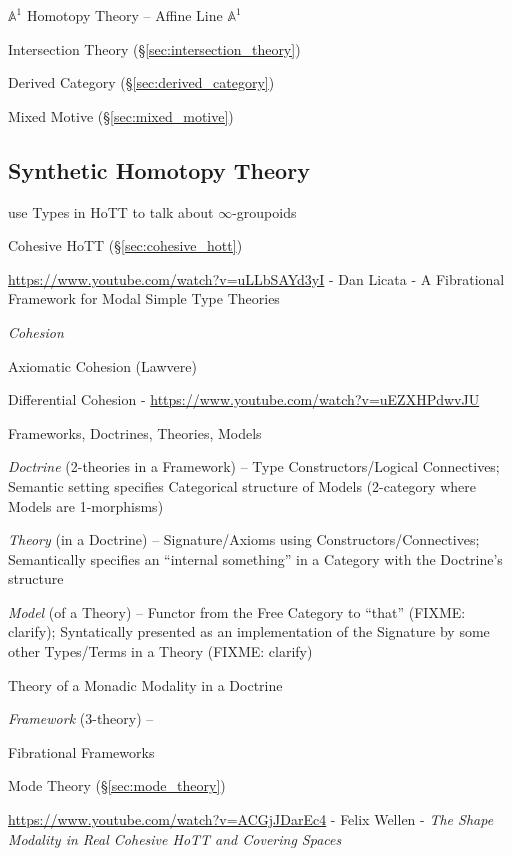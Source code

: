 $\mathbb{A}^1$ Homotopy Theory -- Affine Line $\mathbb{A}^1$

\fist Intersection Theory (\S\ref{sec:intersection_theory})

Derived Category (\S\ref{sec:derived_category})

Mixed Motive (\S\ref{sec:mixed_motive})



\subsection{Synthetic Homotopy Theory}\label{sec:synthetic_homotopy_theory}

use Types in HoTT to talk about $\infty$-groupoids

\fist Cohesive HoTT (\S\ref{sec:cohesive_hott})

\url{https://www.youtube.com/watch?v=uLLbSAYd3yI} - Dan Licata - A Fibrational
Framework for Modal Simple Type Theories

\emph{Cohesion}

Axiomatic Cohesion (Lawvere)

Differential Cohesion - \url{https://www.youtube.com/watch?v=uEZXHPdwvJU}

Frameworks, Doctrines, Theories, Models

\emph{Doctrine} (2-theories in a Framework) -- Type Constructors/Logical
Connectives; Semantic setting specifies Categorical structure of Models
(2-category where Models are 1-morphisms)

\emph{Theory} (in a Doctrine) -- Signature/Axioms using
Constructors/Connectives; Semantically specifies an ``internal something'' in a
Category with the Doctrine's structure

\emph{Model} (of a Theory) -- Functor from the Free Category to ``that'' (FIXME:
clarify); Syntatically presented as an implementation of the Signature by some
other Types/Terms in a Theory (FIXME: clarify)

Theory of a Monadic Modality in a Doctrine

\emph{Framework} (3-theory) --

Fibrational Frameworks

Mode Theory (\S\ref{sec:mode_theory})

\url{https://www.youtube.com/watch?v=ACGjJDarEc4} - Felix Wellen - \emph{The
  Shape Modality in Real Cohesive HoTT and Covering Spaces}

